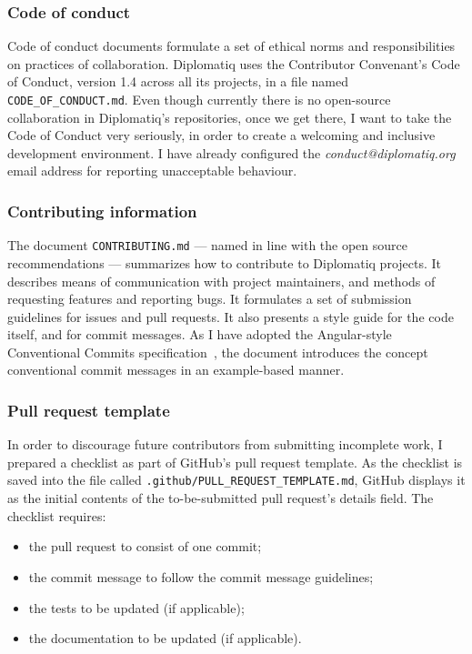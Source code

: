 \subsubsection{Code of conduct}

Code of conduct documents formulate a set of ethical norms and responsibilities on practices of collaboration. Diplomatiq uses the Contributor Convenant's Code of Conduct, version 1.4 across all its projects, in a file named \lstinline{CODE_OF_CONDUCT.md}. Even though currently there is no open-source collaboration in Diplomatiq's repositories, once we get there, I want to take the Code of Conduct very seriously, in order to create a welcoming and inclusive development environment. I have already configured the \emph{conduct@diplomatiq.org} email address for reporting unacceptable behaviour.

\subsubsection{Contributing information}

The document \lstinline{CONTRIBUTING.md} — named in line with the open source recommendations — summarizes how to contribute to Diplomatiq projects. It describes means of communication with project maintainers, and methods of requesting features and reporting bugs. It formulates a set of submission guidelines for issues and pull requests. It also presents a style guide for the code itself, and for commit messages. As I have adopted the Angular-style Conventional Commits specification~\cite{conventionalcommits}, the document introduces the concept conventional commit messages in an example-based manner.

\subsubsection{Pull request template}

In order to discourage future contributors from submitting incomplete work, I prepared a checklist as part of GitHub's pull request template. As the checklist is saved into the file called \lstinline{.github/PULL_REQUEST_TEMPLATE.md}, GitHub displays it as the initial contents of the to-be-submitted pull request's details field. The checklist requires:

\begin{itemize}
\item the pull request to consist of one commit;
\item the commit message to follow the commit message guidelines;
\item the tests to be updated (if applicable);
\item the documentation to be updated (if applicable).
\end{itemize}

